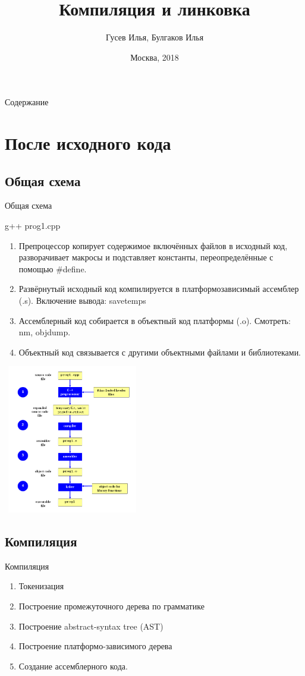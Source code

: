 \documentclass[10pt]{beamer}
\title[\href{https://goo.gl/NRgp8K}{https://goo.gl/NRgp8K} (Term 1)]{Компиляция и линковка}
\author[Гусев Илья, Булгаков Илья]{Гусев Илья, Булгаков Илья}
\institute[МФТИ] 
{Московский физико-технический институт\\*}
\date{Москва, 2018}
\begin{document}
\begin{frame}
  \titlepage
\end{frame}

\begin{frame}{Содержание}
\tableofcontents
\end{frame}

\section{После исходного кода}
\subsection{Общая схема}
\begin{frame}[fragile]{Общая схема}

\begin{multicols}{2}
g++ prog1.cpp
\begin{enumerate}
\item Препроцессор копирует содержимое включённых файлов в исходный код, разворачивает макросы и подставляет константы, переопределённые с помощью \#define.
\item Развёрнутый исходный код компилируется в платформозависимый ассемблер (.s). Включение вывода: \-\-save\-temps
\item Ассемблерный код собирается в объектный код платформы (.o). Смотреть: nm, objdump.
\item Объектный код связывается с другими объектными файлами и библиотеками.
\end{enumerate}
\vfill\eject
 \includegraphics[width=6cm, height=6.5cm]{Term_3/Source/Pictures/compile.png}
\end{multicols}
\end{frame}

\subsection{Компиляция}
\begin{frame}[fragile]{Компиляция}
\begin{enumerate}
    \item Токенизация
    \item Построение промежуточного дерева по грамматике
    \item Построение abstract-syntax tree (AST)
    \item Построение платформо-зависимого дерева
    \item Создание ассемблерного кода.
\end{enumerate}
\end{frame}
\end{document}
